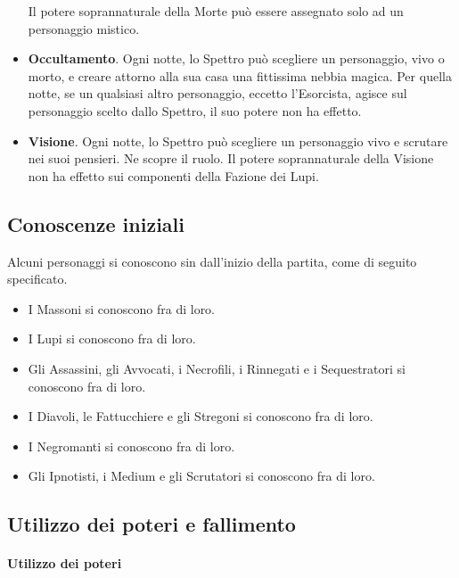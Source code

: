 \documentclass[a4paper,10pt]{article}
\begin{document}
\begin{itemize}
	Il potere soprannaturale della Morte può essere assegnato solo ad un personaggio mistico.
	
 
	\item {\bf Occultamento}. Ogni notte, lo Spettro può scegliere un personaggio, vivo o morto, e creare attorno alla sua casa una fittissima nebbia magica. Per quella notte, se un qualsiasi altro personaggio, eccetto l'Esorcista, agisce sul personaggio scelto dallo Spettro, il suo potere non ha effetto.
 
	\item {\bf Visione}. Ogni notte, lo Spettro può scegliere un personaggio vivo e scrutare nei suoi pensieri. Ne scopre il ruolo. Il potere soprannaturale della Visione non ha effetto sui componenti della Fazione dei Lupi.

\end{itemize}

\subsection{Conoscenze iniziali}

Alcuni personaggi si conoscono sin dall'inizio della partita, come di seguito specificato.

\begin{itemize}
	\item I Massoni si conoscono fra di loro.
	\item I Lupi si conoscono fra di loro.
	\item Gli Assassini, gli Avvocati, i Necrofili, i Rinnegati e i Sequestratori si conoscono fra di loro.
	\item I Diavoli, le Fattucchiere e gli Stregoni si conoscono fra di loro.
	\item I Negromanti si conoscono fra di loro.
	\item Gli Ipnotisti, i Medium e gli Scrutatori si conoscono fra di loro.
\end{itemize}

\subsection{Utilizzo dei poteri e fallimento}
\label{fallimento}

\paragraph{Utilizzo dei poteri} 
\end{document}
